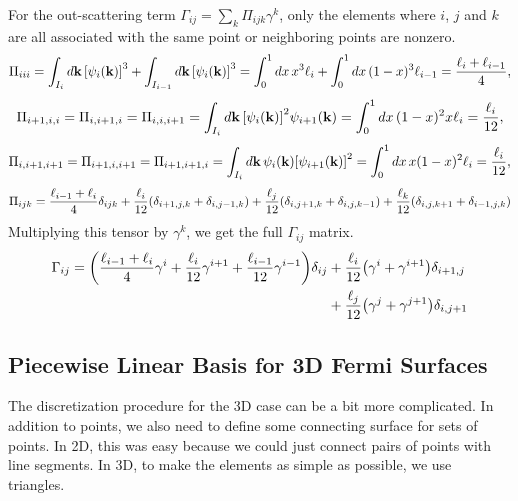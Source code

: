\documentclass[12pt]{article}
\begin{document}
For the out-scattering term $\Gamma_{ij}=\sum_k\Pi_{ijk}\gamma^k$, only the elements where $i$, $j$ and $k$ are all
associated with the same point or neighboring points are nonzero.
\begin{equation}
    \Pi_{iii} = \int_{I_i} \dd{\vb{k}} \qty[\psi_i(\vb{k})]^3 + \int_{I_{i-1}}
        \dd{\vb{k}} \qty[\psi_i(\vb{k})]^3
    = \int_0^1 \dd{x} x^3 \ell_i + \int_0^1 \dd{x} (1-x)^3 \ell_{i-1}
    = \frac{\ell_i + \ell_{i-1}}{4},
\end{equation}
\begin{equation}
    \Pi_{i+1,i,i} = \Pi_{i,i+1,i} = \Pi_{i,i,i+1} = \int_{I_i} \dd{\vb{k}}
    \qty[\psi_i(\vb{k})]^2\psi_{i+1}(\vb{k}) = \int_0^1 \dd{x} (1-x)^2 x \ell_i = \frac{\ell_i}{12},
\end{equation}
\begin{equation}
    \Pi_{i,i+1,i+1} = \Pi_{i+1,i,i+1} = \Pi_{i+1,i+1,i} = \int_{I_i} \dd{\vb{k}}
    \psi_i(\vb{k})\qty[\psi_{i+1}(\vb{k})]^2 = \int_0^1 \dd{x} x(1-x)^2 \ell_i = \frac{\ell_i}{12},
\end{equation}
\begin{equation}
    \Pi_{ijk} = \frac{\ell_{i-1} + \ell_i}{4}\delta_{ijk}
    + \frac{\ell_i}{12}\qty(\delta_{i+1,j,k} + \delta_{i,j-1,k})
    + \frac{\ell_j}{12}\qty(\delta_{i,j+1,k} + \delta_{i,j,k-1})
    + \frac{\ell_k}{12}\qty(\delta_{i,j,k+1} + \delta_{i-1,j,k})
\end{equation}
Multiplying this tensor by $\gamma^k$, we get the full $\Gamma_{ij}$ matrix.
\begin{equation}
\begin{aligned}
    \Gamma_{ij} = \qty(\frac{\ell_{i-1} + \ell_i}{4}\gamma^i + \frac{\ell_i}{12}\gamma^{i+1}
        + \frac{\ell_{i-1}}{12}\gamma^{i-1})\delta_{ij}
    &+ \frac{\ell_i}{12}\qty(\gamma^i + \gamma^{i+1})\delta_{i+1,j} \\
    &+ \frac{\ell_j}{12}\qty(\gamma^j + \gamma^{j+1})\delta_{i,j+1}
\end{aligned}
\end{equation}

\subsection{Piecewise Linear Basis for 3D Fermi Surfaces}
The discretization procedure for the 3D case can be a bit more complicated. In addition to points,
we also need to define some connecting surface for sets of points. In 2D, this was easy because we
could just connect pairs of points with line segments. In 3D, to make the elements as simple as
possible, we use triangles.
\end{document}

